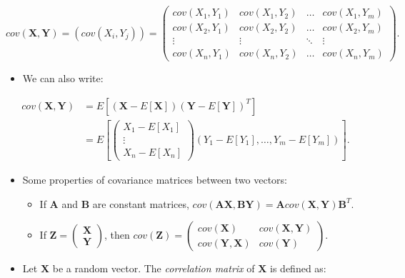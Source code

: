 \documentclass[
  12pt,
]{book}
\providecommand{\tightlist}{%
  \setlength{\itemsep}{0pt}\setlength{\parskip}{0pt}}
\begin{document}
\[
cov(\boldsymbol{X}, \boldsymbol{Y}) = (cov(X_i, Y_j)) =
\left(\begin{array}{cccc} cov(X_1, Y_1) & cov(X_1, Y_2) & \ldots & cov(X_1, Y_m) \\
                          cov(X_2, Y_1) & cov(X_2, Y_2) & \ldots & cov(X_2, Y_m) \\
                          \vdots        & \vdots        & \ddots & \vdots        \\
                          cov(X_n, Y_1) & cov(X_n, Y_2) & \ldots & cov(X_n, Y_m) \end{array}\right).
\]

\begin{itemize}
\tightlist
\item
  We can also write:
\end{itemize}

\[\begin{aligned}
cov(\boldsymbol{X}, \boldsymbol{Y}) &= E[(\boldsymbol{X} - E[\boldsymbol{X}])(\boldsymbol{Y} - E[\boldsymbol{Y}])^T] \\
&= E\left[ \left(\begin{array}{c} X_1 - E[X_1] \\ \vdots \\ X_n - E[X_n] \end{array}\right) \left( Y_1 - E[Y_1], \ldots, Y_m - E[Y_m] \right) \right].
\end{aligned}\]

\begin{itemize}
\item
  Some properties of covariance matrices between two vectors:

  \begin{itemize}
  \item
    If \(\boldsymbol{A}\) and \(\boldsymbol{B}\) are constant matrices, \(cov(\boldsymbol{A} \boldsymbol{X}, \boldsymbol{B} \boldsymbol{Y}) = \boldsymbol{A} cov(\boldsymbol{X},  \boldsymbol{Y}) \boldsymbol{B}^T.\)
  \item
    If \(\boldsymbol{Z} = \left(\begin{array}{c} \boldsymbol{X} \\ \boldsymbol{Y} \end{array}\right)\), then \(cov(\boldsymbol{Z}) = \left(\begin{array}{cc} cov(\boldsymbol{X}) & cov(\boldsymbol{X}, \boldsymbol{Y}) \\ cov(\boldsymbol{Y}, \boldsymbol{X}) & cov(\boldsymbol{Y}) \end{array}\right)\).
  \end{itemize}
\item
  Let \(\boldsymbol{X}\) be a random vector. The \emph{correlation matrix} of \(\boldsymbol{X}\) is defined as:
\end{itemize}
\end{document}
